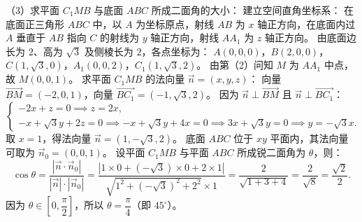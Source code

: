 \begin{answer}
（3）求平面 $C_1MB$ 与底面 $ABC$ 所成二面角的大小：
建立空间直角坐标系：
在底面正三角形 $ABC$ 中，以 $A$ 为坐标原点，射线 $AB$ 为 $x$ 轴正方向，在底面内过 $A$ 垂直于 $AB$ 指向 $C$ 的射线为 $y$ 轴正方向，射线 $AA_1$ 为 $z$ 轴正方向。
由底面边长为 $2$、高为 $\sqrt{3}$ 及侧棱长为 $2$，各点坐标为：
$A(0, 0, 0)$，$B(2, 0, 0)$，$C(1, \sqrt{3}, 0)$，$A_1(0, 0, 2)$，$C_1(1, \sqrt{3}, 2)$。
由第（2）问知 $M$ 为 $AA_1$ 中点，故 $M(0, 0, 1)$。
求平面 $C_1MB$ 的法向量 $\vec{n}=(x, y, z)$：
向量 $\vec{BM}=(-2, 0, 1)$，向量 $\vec{BC_1}=(-1, \sqrt{3}, 2)$。
因为 $\vec{n}\perp\vec{BM}$ 且 $\vec{n}\perp\vec{BC_1}$：
\nopagebreak[4]
\[
\begin{cases}
-2x+z=0 \implies z=2x, \\
-x+\sqrt{3}y+2z=0 \implies -x+\sqrt{3}y+4x=0 \implies 3x+\sqrt{3}y=0 \implies y=-\sqrt{3}x.
\end{cases}
\]
取 $x=1$，得法向量 $\vec{n}=(1, -\sqrt{3}, 2)$。
底面 $ABC$ 位于 $xy$ 平面内，其法向量可取为 $\vec{n}_0=(0, 0, 1)$。
设平面 $C_1MB$ 与平面 $ABC$ 所成锐二面角为 $\theta$，则：
\nopagebreak[4]
\[
\cos\theta=\frac{|\vec{n}\cdot\vec{n}_0|}{|\vec{n}|\cdot|\vec{n}_0|}=\frac{|1\times 0+(-\sqrt{3})\times 0+2\times 1|}{\sqrt{1^2+(-\sqrt{3})^2+2^2}\times 1}=\frac{2}{\sqrt{1+3+4}}=\frac{2}{\sqrt{8}}=\frac{\sqrt{2}}{2}.
\]
因为 $\theta\in\left[0, \dfrac{\pi}{2}\right]$，所以 $\theta=\dfrac{\pi}{4}$（即 $45^\circ$）。


\end{answer}
